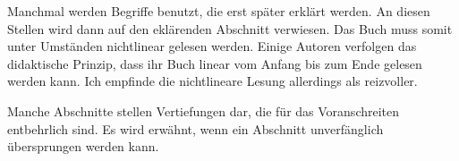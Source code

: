 
Manchmal werden Begriffe benutzt, die erst später erklärt werden.
An diesen Stellen wird dann auf den eklärenden Abschnitt verwiesen.
Das Buch muss somit unter Umständen nichtlinear gelesen werden. Einige
Autoren verfolgen das didaktische Prinzip, dass ihr Buch linear vom Anfang
bis zum Ende gelesen werden kann. Ich empfinde die nichtlineare Lesung
allerdings als reizvoller.

Manche Abschnitte stellen Vertiefungen dar, die für das Voranschreiten
entbehrlich sind. Es wird erwähnt, wenn ein Abschnitt unverfänglich
übersprungen werden kann.

